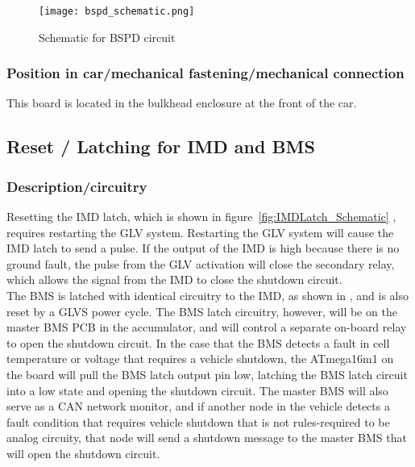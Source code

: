 \documentclass{article}
\begin{document}
  \begin{figure}[H]
        \centering
        \texttt{[image: bspd\_schematic.png]}
        \caption{Schematic for BSPD circuit}
        \label{fig:bspd_schematic}
  \end{figure}

\subsubsection{Position in car/mechanical fastening/mechanical connection}

This board is located in the bulkhead enclosure at the front of the car.

\subsection{Reset / Latching for IMD and BMS}\label{reset_latching_for_imd_and_bms}
\subsubsection{Description/circuitry}

Resetting the IMD latch, which is shown in figure~\ref{fig:IMDLatch_Schematic} , requires restarting the GLV system. Restarting the GLV system will cause the IMD latch to send a pulse. If the output of the IMD is high because there is no ground fault, the pulse from the GLV activation will close the secondary relay, which allows the signal from the IMD to close the shutdown circuit.\\

The BMS is latched with identical circuitry to the IMD, as shown in , and is also reset by a GLVS power cycle. The BMS latch circuitry, however, will be on the master BMS PCB in the accumulator, and will control a separate on-board relay to open the shutdown circuit. In the case that the BMS detects a fault in cell temperature or voltage that requires a vehicle shutdown, the ATmega16m1 on the board will pull the BMS latch output pin low, latching the BMS latch circuit into a low state and opening the shutdown circuit. The master BMS will also serve as a CAN network monitor, and if another node in the vehicle detects a fault condition that requires vehicle shutdown that is not rules-required to be analog circuity, that node will send a shutdown message to the master BMS that will open the shutdown circuit. 
\end{document}
